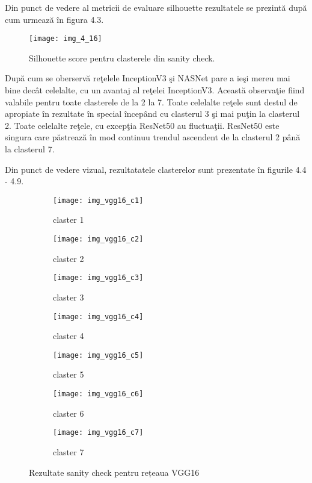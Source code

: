 Din punct de vedere al metricii de evaluare silhouette rezultatele se prezintă după cum urmează în figura 4.3.
\begin{figure}[!h]
	\centering
	\texttt{[image: img\_4\_16]}
	\caption[Silhouette score pentru clasterele din sanity check]{Silhouette score pentru clasterele din sanity check.}
\end{figure} 
După cum se oberservă reţelele InceptionV3 şi NASNet pare a ieşi
mereu mai bine decât celelalte, cu un avantaj al reţelei InceptionV3. Această observaţie
fiind valabile pentru toate clasterele de la 2 la 7. Toate celelalte reţele sunt destul de
apropiate în rezultate în special începând cu clasterul 3 şi mai puţin la clasterul 2. Toate
celelalte reţele, cu excepţia ResNet50 au fluctuaţii. ResNet50 este singura care păstrează
în mod continuu trendul ascendent de la clasterul 2 până la clasterul 7.

Din punct de vedere vizual, rezultatatele clasterelor sunt prezentate în figurile 4.4 - 4.9.
\begin{figure}[!tbp]
  \centering
  \begin{subfigure}[b]{0.48\textwidth}
    \texttt{[image: img\_vgg16\_c1]}
    \caption{claster 1}
  \end{subfigure}
  \hfill
  \begin{subfigure}[b]{0.48\textwidth}
    \texttt{[image: img\_vgg16\_c2]}
    \caption{claster 2}
  \end{subfigure}
   \hfill
  \begin{subfigure}[b]{0.48\textwidth}
    \texttt{[image: img\_vgg16\_c3]}
    \caption{claster 3}
  \end{subfigure}
  \hfill
  \begin{subfigure}[b]{0.48\textwidth}
    \texttt{[image: img\_vgg16\_c4]}
    \caption{claster 4}
  \end{subfigure}
  \hfill
  \begin{subfigure}[b]{0.48\textwidth}
    \texttt{[image: img\_vgg16\_c5]}
    \caption{claster 5}
  \end{subfigure}
  \hfill
  \begin{subfigure}[b]{0.48\textwidth}
    \texttt{[image: img\_vgg16\_c6]}
    \caption{claster 6}
  \end{subfigure}
    \hfill
  \begin{subfigure}[b]{0.48\textwidth}
    \texttt{[image: img\_vgg16\_c7]}
    \caption{claster 7}
  \end{subfigure}
  \caption[Rezultate sanity check pentru rețeaua VGG16]{Rezultate sanity check pentru rețeaua VGG16}
\end{figure}


